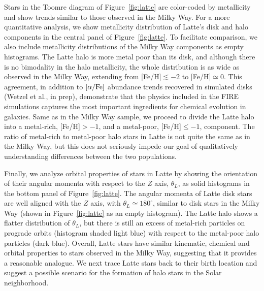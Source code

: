 \documentclass[apj, twocolappendix, numberedappendix, appendixfloats]{emulateapj}
\begin{document}
Stars in the Toomre diagram of Figure~\ref{fig:latte} are color-coded by metallicity and show trends similar to those observed in the Milky Way.
For a more quantitative analysis, we show metallicity distribution of Latte's disk and halo components in the central panel of Figure~\ref{fig:latte}.
To facilitate comparison, we also include metallicity distributions of the Milky Way components as empty histograms.
The Latte halo is more metal poor than its disk, and although there is no bimodality in the halo metallicity, the whole distribution is as wide as observed in the Milky Way, extending from [Fe/H]$\lesssim-2$ to [Fe/H]$\simeq0$.
This agreement, in addition to $\rm[\alpha/Fe]$ abundance trends recovered in simulated disks (Wetzel et al., in prep), demonstrate that the physics included in the FIRE simulations captures the most important ingredients for chemical evolution in galaxies.
Same as in the Milky Way sample, we proceed to divide the Latte halo into a metal-rich, [Fe/H]$>-1$, and a metal-poor, [Fe/H]$\leq-1$, component.
The ratio of metal-rich to metal-poor halo stars in Latte is not quite the same as in the Milky Way, but this does not seriously impede our goal of qualitatively understanding differences between the two populations.

Finally, we analyze orbital properties of stars in Latte by showing the orientation of their angular momenta with respect to the $Z$ axis, $\theta_L$, as solid histograms in the bottom panel of Figure~\ref{fig:latte}.
The angular momenta of Latte disk stars are well aligned with the $Z$ axis, with $\theta_L\simeq180^\circ$, similar to disk stars in the Milky Way (shown in Figure~\ref{fig:latte} as an empty histogram).
The Latte halo shows a flatter distribution of $\theta_L$, but there is still an excess of metal-rich particles on prograde orbits (histogram shaded light blue) with respect to the metal-poor halo particles (dark blue).
Overall, Latte stars have similar kinematic, chemical and orbital properties to stars observed in the Milky Way, suggesting that it provides a reasonable analogue.
We next trace Latte stars back to their birth location and suggest a possible scenario for the formation of halo stars in the Solar neighborhood.
\end{document}
